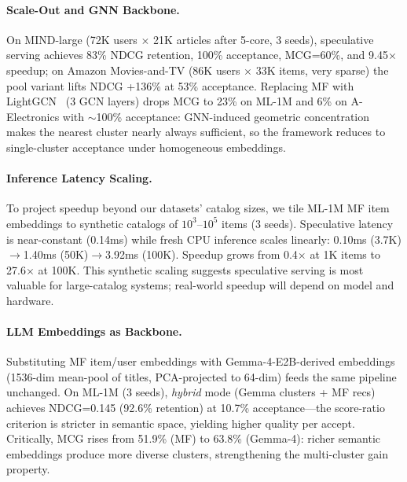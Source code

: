 \documentclass[sigconf,nonacm=false]{acmart}
\begin{document}
\paragraph{Scale-Out and GNN Backbone.}
On MIND-large (72K users $\times$ 21K articles after 5-core, 3 seeds), speculative serving achieves 83\% NDCG retention, 100\% acceptance, MCG=60\%, and 9.45$\times$ speedup; on Amazon Movies-and-TV (86K users $\times$ 33K items, very sparse) the pool variant lifts NDCG +136\% at 53\% acceptance. Replacing MF with LightGCN~\cite{lightgcn2020} (3 GCN layers) drops MCG to 23\% on ML-1M and 6\% on A-Electronics with $\sim$100\% acceptance: GNN-induced geometric concentration makes the nearest cluster nearly always sufficient, so the framework reduces to single-cluster acceptance under homogeneous embeddings.

\paragraph{Inference Latency Scaling.}
To project speedup beyond our datasets' catalog sizes, we tile ML-1M MF item embeddings to synthetic catalogs of $10^3$--$10^5$ items (3 seeds). Speculative latency is near-constant (0.14ms) while fresh CPU inference scales linearly: 0.10ms (3.7K)$\to$1.40ms (50K)$\to$3.92ms (100K). Speedup grows from 0.4$\times$ at 1K items to 27.6$\times$ at 100K. This synthetic scaling suggests speculative serving is most valuable for large-catalog systems; real-world speedup will depend on model and hardware.

\paragraph{LLM Embeddings as Backbone.}
Substituting MF item/user embeddings with Gemma-4-E2B-derived embeddings~\cite{gemma4_2025} (1536-dim mean-pool of titles, PCA-projected to 64-dim) feeds the same pipeline unchanged. On ML-1M (3 seeds), \emph{hybrid} mode (Gemma clusters + MF recs) achieves NDCG=0.145 (92.6\% retention) at 10.7\% acceptance---the score-ratio criterion is stricter in semantic space, yielding higher quality per accept. Critically, MCG rises from 51.9\% (MF) to 63.8\% (Gemma-4): richer semantic embeddings produce more diverse clusters, strengthening the multi-cluster gain property.
\end{document}
